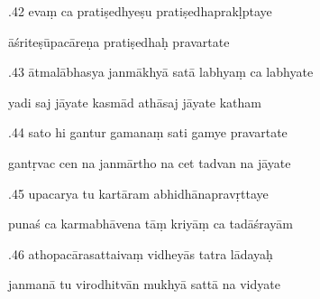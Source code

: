 \documentclass[article,12pt,a4paper]{memoir}%
\newcounter{parCount}
\begin{document}
	  
	  \pstart {}.42 evaṃ ca pratiṣedhyeṣu pratiṣedhaprakḷptaye 
	{}
	\pend%
      

	  
	  \pstart \leavevmode%
	āśriteṣūpacāreṇa pratiṣedhaḥ pravartate 
	{}
	\pend%
      

	  
	  \pstart {}.43 ātmalābhasya janmākhyā satā labhyaṃ ca labhyate 
	{}
	\pend%
      

	  
	  \pstart \leavevmode%
	yadi saj jāyate kasmād athāsaj jāyate katham 
	{}
	\pend%
      

	  
	  \pstart {}.44 sato hi gantur gamanaṃ sati gamye pravartate 
	{}
	\pend%
      

	  
	  \pstart \leavevmode%
	gantṛvac cen na janmārtho na cet tadvan na jāyate 
	{}
	\pend%
      

	  
	  \pstart {}.45 upacarya tu kartāram abhidhānapravṛttaye 
	{}
	\pend%
      

	  
	  \pstart \leavevmode%
	punaś ca karmabhāvena tāṃ kriyāṃ ca tadāśrayām 
	{}
	\pend%
      

	  
	  \pstart {}.46 athopacārasattaivaṃ vidheyās tatra lādayaḥ 
	{}
	\pend%
      

	  
	  \pstart \leavevmode%
	janmanā tu virodhitvān mukhyā sattā na vidyate 
	{}
	\pend%
      
\end{document}
